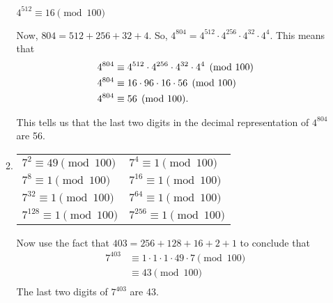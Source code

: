 \begin{enumerate}
\begin{enumerate}
\begin{multicols}{2}
$4^{512}  \equiv 16 \pmod{100}$

\end{multicols}
Now,  $804 = 512 + 256 + 32 + 4$.  So,  
$4^{804}  = 4^{512}  \cdot 4^{256}  \cdot 4^{32}  \cdot 4^4 $.  This means that
\[
\begin{aligned}
  4^{804}  &\equiv 4^{512}  \cdot 4^{256}  \cdot 4^{32}  \cdot 4^4  \pmod{100} \hfill \\
  4^{804}  &\equiv 16 \cdot 96 \cdot 16 \cdot 56 \pmod{100} \hfill \\
  4^{804}  &\equiv 56 \pmod{100}. \hfill \\ 
\end{aligned}
\]

This tells us that the last two digits in the decimal representation of  $4^{804} $
 are  56.

\item 
\begin{tabular}[t]{l l}
$7^2 \equiv 49 \pmod {100}$ & $7^4 \equiv 1 \pmod {100}$ \\
$7^{8} \equiv 1 \pmod {100}$ & $7^{16} \equiv 1 \pmod {100}$ \\
$7^{32} \equiv 1 \pmod {100}$ & $7^{64} \equiv 1 \pmod{100}$ \\
$7^{128} \equiv 1 \pmod {100}$ & $7^{256} \equiv 1 \pmod {100}$ \\
\end{tabular}

Now use the fact that $403 = 256 + 128 + 16 + 2 + 1$ to conclude that
\[
\begin{aligned}
7^{403} &\equiv 1 \cdot 1 \cdot 1 \cdot 49 \cdot 7 \pmod {100} \\
         & \equiv 43 \pmod {100} \\
\end{aligned}
\]
The last two digits of $7^{403}$ are 43.
\end{enumerate}

\end{enumerate}
\hbreak

\endinput






